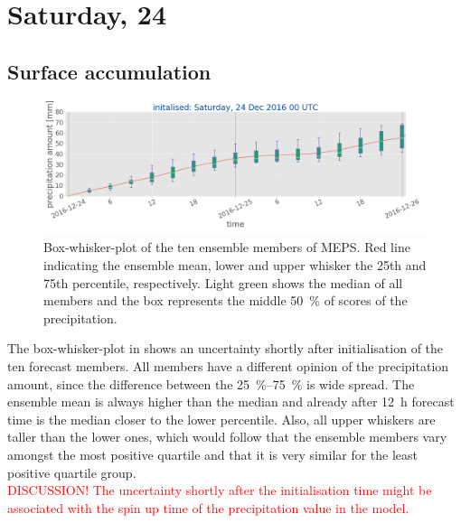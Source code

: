 \section{Saturday, \SI{24}{\dec}}\label{sec:2412}



\subsection{Surface accumulation}

\begin{figure}[t]
	\includegraphics[width=\textwidth]{./fig_boxplot_sfc/20161224_0}
	\caption{Box-whisker-plot of the ten ensemble members of MEPS. Red line indicating the ensemble mean, lower and upper whisker the 25th and 75th percentile, respectively. Light green shows the median of all members and the box represents the middle \SI{50}{\percent} of scores of the precipitation.}\label{fig:boxplt24}
\end{figure}
The box-whisker-plot in  shows an uncertainty shortly after initialisation of the ten forecast members. All members have a different opinion of the precipitation amount, since the difference between the \SIrange{25}{75}{\percent} is wide spread.
The ensemble mean is always higher than the median and already after \SI{12}{\hour} forecast time is the median closer to the lower percentile. Also, all upper whiskers are taller than the lower ones, which would follow that the ensemble members vary amongst the most positive quartile and that it is very similar for the least positive quartile group.
\\
\textcolor{red}{DISCUSSION! The uncertainty shortly after the initialisation time might be associated with the spin up time of the precipitation value in the model. }
